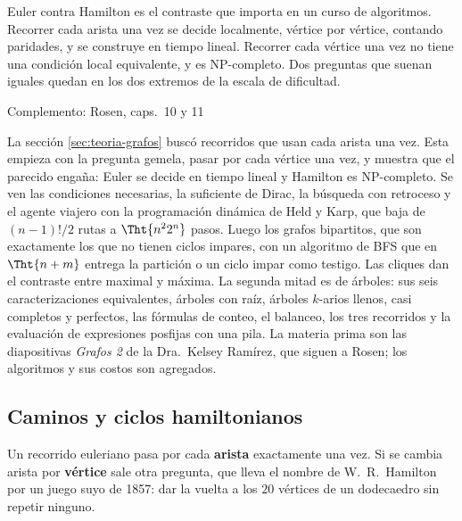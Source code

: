 \documentclass[11pt,letterpaper]{article}
\begin{document}
\begin{idea}
  Euler contra Hamilton es el contraste que importa en un curso de
  algoritmos. Recorrer cada arista una vez se decide localmente,
  vértice por vértice, contando paridades, y se construye en tiempo
  lineal. Recorrer cada vértice una vez no tiene una condición local
  equivalente, y es NP-completo. Dos preguntas que suenan iguales
  quedan en los dos extremos de la escala de dificultad.
\end{idea}

\newpage


%
      {Complemento: Rosen, caps.\ 10 y 11}
\label{sec:hamilton-arboles}

\begin{quick_sum}
  La sección \ref{sec:teoria-grafos} buscó recorridos que usan cada
  arista una vez. Esta empieza con la pregunta gemela, pasar por cada
  vértice una vez, y muestra que el parecido engaña: Euler se decide
  en tiempo lineal y Hamilton es NP-completo. Se ven las condiciones
  necesarias, la suficiente de Dirac, la búsqueda con retroceso y el
  agente viajero con la programación dinámica de Held y Karp, que
  baja de $(n-1)!/2$ rutas a $\Tht{n^2 2^n}$ pasos. Luego los grafos
  bipartitos, que son exactamente los que no tienen ciclos impares,
  con un algoritmo de BFS que en $\Tht{n + m}$ entrega la partición o
  un ciclo impar como testigo. Las cliques dan el contraste entre
  maximal y máxima. La segunda mitad es de árboles: sus seis
  caracterizaciones equivalentes, árboles con raíz, árboles $k$-arios
  llenos, casi completos y perfectos, las fórmulas de conteo, el
  balanceo, los tres recorridos y la evaluación de expresiones
  posfijas con una pila. La materia prima son las diapositivas
  \textit{Grafos 2} de la Dra.\ Kelsey Ramírez, que siguen a Rosen;
  los algoritmos y sus costos son agregados.
\end{quick_sum}

\subsection*{Caminos y ciclos hamiltonianos}

Un recorrido euleriano pasa por cada \textbf{arista} exactamente una
vez. Si se cambia arista por \textbf{vértice} sale otra pregunta, que
lleva el nombre de W.\ R.\ Hamilton por un juego suyo de 1857: dar la
vuelta a los $20$ vértices de un dodecaedro sin repetir ninguno.
\end{document}
